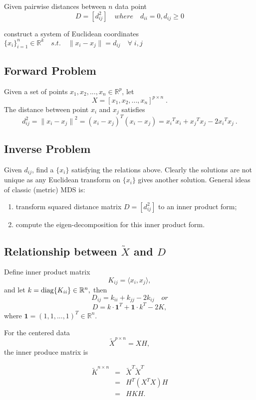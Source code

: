 \documentclass[twoside]{article}
\theoremstyle{definition}
\theoremstyle{definition}
\theoremstyle{remark}
\def\diag{{\rm diag}}
\begin{document}
Given pairwise distances between $n$ data point 
$$ D = [d_{ij}^2] \quad where \quad d_{ii} = 0, d_{ij}\ge 0 $$

construct a system of Euclidean coordinates $\{x_i\}_{i=1}^n\in \mathbb{R}^k \quad s.t. \quad \|x_i-x_j\| =d_{ij} \quad \forall \; i,j$

\subsection{Forward Problem}

Given a set of points $x_1, x_2, ..., x_n \in \mathbb{R}^p$, let 
$$ X = [x_1, x_2, ..., x_n]^{p\times n}\;.$$
The distance between point $x_i$ and $x_j$ satisfies 
$$ d_{ij}^2 = {\|x_i - x_j\|}^2 = {(x_i-x_j)}^T(x_i-x_j) = {x_i}^T x_i + {x_j}^T x_j - 2{x_i}^Tx_j\ . $$

\subsection{Inverse Problem}
Given $d_{ij}$, find a $\{x_i\}$ satisfying the relations above. Clearly the solutions are not unique as any Euclidean transform on $\{x_i\}$ gives another solution. General ideas of classic (metric) MDS is:
\begin{enumerate}
\item transform squared distance matrix $D=[d_{ij}^2]$ to an inner product form;
\item compute the eigen-decomposition for this inner product form. 
\end{enumerate} 


\subsection{Relationship between $\tilde{X}$ and $D$}

Define inner product matrix 
$$ K_{ij} = \langle x_i,x_j\rangle, $$ 
and let $k = \diag \{K_{ii}\} \in \mathbb{R}^n,$ then 
$$D_{ij} = k_{ii} + k_{jj} - 2k_{ij} \quad or$$
$$ D = k\cdot {\mathbf{1}}^T + \mathbf{1} \cdot k^T -2K, $$
where $\mathbf{1} = (1,1,..., 1)^T \in \mathbb{R}^n$. 

For the centered data 
$$ \tilde{X}^{p\times n} = XH ,$$ 
the inner produce matrix is

\begin{eqnarray*}
\tilde{K}^{n \times n} &=& \tilde{X}^T \tilde{X}^T \\
 &=& H^T (X^TX)H \\
 &=& HKH.
\end{eqnarray*}
\end{document}
